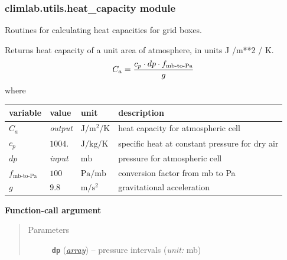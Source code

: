 \documentclass[a4paper,10pt,english]{sphinxmanual}
\begin{document}
\subsubsection{climlab.utils.heat\_capacity module}
\label{api/climlab.utils:module-climlab.utils.heat_capacity}\label{api/climlab.utils:climlab-utils-heat-capacity-module}
Routines for calculating heat capacities for grid boxes.

\begin{fulllineitems}
\label{api/climlab.utils:climlab.utils.heat_capacity.atmosphere}
Returns heat capacity of a unit area of atmosphere, in units J /m**2 / K.
\begin{gather}
\begin{split}C_a = \frac{c_p \cdot dp \cdot f_{\textrm{mb-to-Pa}}}{g}\end{split}\notag
\end{gather}
where

\begin{tabulary}{\linewidth}{|L|L|L|L|}
\hline
\textsf{\relax 
variable
} & \textsf{\relax 
value
} & \textsf{\relax 
unit
} & \textsf{\relax 
description
}\\
\hline
\(C_a\)
 & 
\emph{output}
 & 
\(\textrm{J} / \textrm{m}^2 / \textrm{K}\)
 & 
heat capacity for atmospheric cell
\\
\hline
\(c_p\)
 & 
\(1004.\)
 & 
\(\textrm{J} / \textrm{kg} / \textrm{K}\)
 & 
specific heat at constant pressure for dry air
\\
\hline
\(dp\)
 & 
\emph{input}
 & 
\(\textrm{mb}\)
 & 
pressure for atmospheric cell
\\
\hline
\(f_{\textrm{mb-to-Pa}}\)
 & 
\(100\)
 & 
\(\textrm{Pa} / \textrm{mb}\)
 & 
conversion factor from mb to Pa
\\
\hline
\(g\)
 & 
\(9.8\)
 & 
\(\textrm{m} / \textrm{s}^2\)
 & 
gravitational acceleration
\\
\hline\end{tabulary}


\textbf{Function-call argument}
\begin{quote}\begin{description}
\item[{Parameters}] \leavevmode
\textbf{\texttt{dp}} (\href{http://docs.python.org/2.7/library/array.html\#module-array}{\emph{array}}) -- pressure intervals (\emph{unit:} mb)


\end{description}
\end{quote}
\end{fulllineitems}
\end{document}
